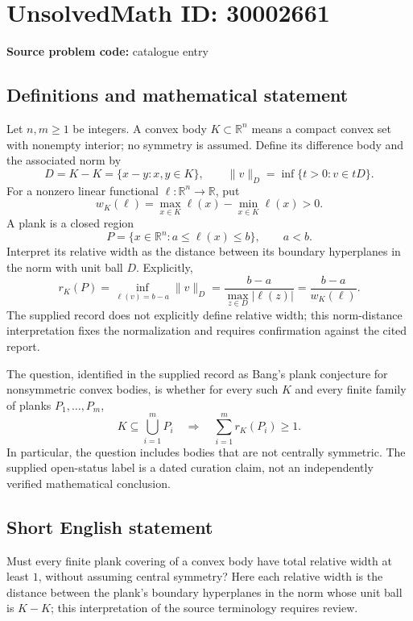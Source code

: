 \documentclass[11pt]{article}
\newcommand{\R}{\mathbb{R}}
\begin{document}
\section*{UnsolvedMath ID: 30002661}
\textbf{Source problem code:} catalogue entry
\subsection{Definitions and mathematical statement}
Let \(n,m\geq 1\) be integers. A convex body \(K\subset\R^n\) means a compact convex set with nonempty interior; no symmetry is assumed. Define its difference body and the associated norm by
\[
D=K-K=\{x-y:x,y\in K\},\qquad
\|v\|_D=\inf\{t>0:v\in tD\}.
\]
For a nonzero linear functional \(\ell:\R^n\to\R\), put
\[
w_K(\ell)=\max_{x\in K}\ell(x)-\min_{x\in K}\ell(x)>0.
\]
A plank is a closed region
\[
P=\{x\in\R^n:a\leq\ell(x)\leq b\},\qquad a<b.
\]
Interpret its relative width as the distance between its boundary hyperplanes in the norm with unit ball \(D\). Explicitly,
\[
r_K(P)=\inf_{\ell(v)=b-a}\|v\|_D
=\frac{b-a}{\max_{z\in D}|\ell(z)|}
=\frac{b-a}{w_K(\ell)}.
\]
The supplied record does not explicitly define relative width; this norm-distance interpretation fixes the normalization and requires confirmation against the cited report.

The question, identified in the supplied record as Bang's plank conjecture for nonsymmetric convex bodies, is whether for every such \(K\) and every finite family of planks \(P_1,\ldots,P_m\),
\[
K\subseteq\bigcup_{i=1}^{m}P_i
\quad\Longrightarrow\quad
\sum_{i=1}^{m}r_K(P_i)\geq 1.
\]
In particular, the question includes bodies that are not centrally symmetric. The supplied open-status label is a dated curation claim, not an independently verified mathematical conclusion.
\subsection{Short English statement}
Must every finite plank covering of a convex body have total relative width at least \(1\), without assuming central symmetry? Here each relative width is the distance between the plank's boundary hyperplanes in the norm whose unit ball is \(K-K\); this interpretation of the source terminology requires review.
\end{document}
